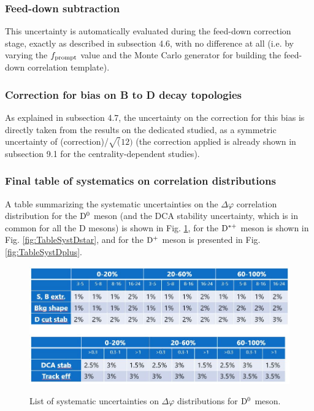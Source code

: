 \subsubsection{Feed-down subtraction}
This uncertainty is automatically evaluated during the feed-down correction stage, exactly as described in subsection 4.6, with no difference at all (i.e. by varying the $f_{\rm prompt}$ value and the Monte Carlo generator for building the feed-down correlation template).

\subsubsection{Correction for bias on B to D decay topologies}
As explained in subsection 4.7, the uncertainty on the correction for this bias is directly taken from the results on the dedicated studied, as a symmetric uncertainty of (correction)/$\sqrt(12)$ (the correction applied is already shown in subsection 9.1 for the centrality-dependent studies).

\subsubsection{Final table of systematics on correlation distributions}
A table summarizing the systematic uncertainties on the $\Delta\varphi$ correlation distribution for the ${\rm D^0}$ meson (and the DCA stability uncertainty, which is in common for all the D mesons) is shown in Fig. \ref{fig:TableSystDzero}, for the ${\rm D^{*+}}$ meson is shown in Fig. \ref{fig:TableSystDstar}, and for the ${\rm D^+}$ meson is presented in Fig. \ref{fig:TableSystDplus}.

\begin{figure}
\centering
{\includegraphics[width=0.95\linewidth]{figuresVsCent/Dzero/D0mesonUncert.JPG}}
\caption{List of systematic uncertainties on $\Delta\varphi$ distributions for ${\rm D^0}$ meson.}
\label{fig:TableSystDzero}
\end{figure}


